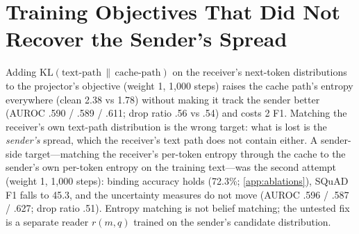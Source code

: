 \documentclass{article}
\begin{document}
\section{Training Objectives That Did Not Recover the Sender's Spread}
\label{app:negative}

\begin{table}[h]
\caption{Two projectors trained with an uncertainty objective (weight 1, 1,000 steps), scored exactly as in \cref{tab:confidence}.}
\label{tab:negative}
\vskip 0.1in
\begin{center}
\begin{small}
\end{small}
\end{center}
\end{table}

Adding $\mathrm{KL}(\text{text-path} \,\|\, \text{cache-path})$ on the receiver's next-token distributions to the projector's objective (weight 1, 1,000 steps) raises the cache path's entropy everywhere (clean 2.38 vs 1.78) without making it track the sender better (AUROC .590 / .589 / .611; drop ratio .56 vs .54) and costs 2 F1. Matching the receiver's own text-path distribution is the wrong target: what is lost is the \emph{sender's} spread, which the receiver's text path does not contain either. A sender-side target---matching the receiver's per-token entropy through the cache to the sender's own per-token entropy on the training text---was the second attempt (weight 1, 1,000 steps): binding accuracy holds (72.3\%; \cref{app:ablations}), SQuAD F1 falls to 45.3, and the uncertainty measures do not move (AUROC .596 / .587 / .627; drop ratio .51). Entropy matching is not belief matching; the untested fix is a separate reader $r(m, q)$ trained on the sender's candidate distribution.
\end{document}
